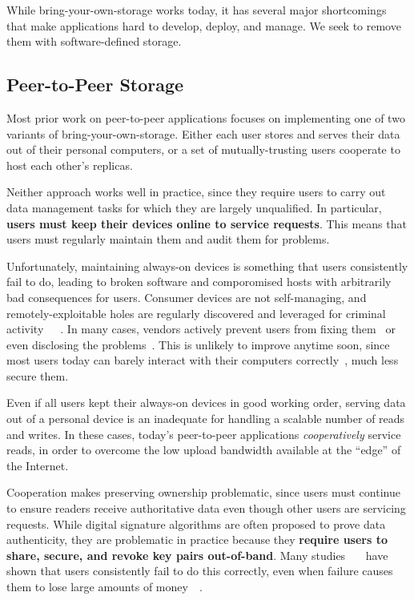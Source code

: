 While bring-your-own-storage works today, it has several major shortcomings that
make applications hard to develop, deploy, and manage.  We seek to remove them
with software-defined storage.

\subsection{Peer-to-Peer Storage}

Most prior work on peer-to-peer applications
focuses on implementing one of two variants of bring-your-own-storage.
Either each user stores and serves their
data out of their personal computers, or a set of mutually-trusting
users cooperate to host each other's replicas.

Neither approach works well in practice, since they require users to carry
out data management tasks for which they are largely unqualified.
In particular, \textbf{users must keep their devices online to service requests}.
This means that users must regularly maintain them and audit them
for problems.

Unfortunately, maintaining always-on devices is something that
users consistently fail to do, leading to broken software and comporomised hosts with arbitrarily
bad consequences for users.  Consumer devices are not self-managing,
and remotely-exploitable holes are regularly discovered and leveraged
for criminal activity~\cite{iot-weaknesses}~\cite{mining-your-ps-and-qs}~\cite{router-exploits}.
In many cases, vendors actively prevent users from fixing
them~\cite{eff-reports} or even disclosing the problems~\cite{sueing-researchers}.
This is unlikely to improve anytime soon, since most users today can barely
interact with their computers correctly~\cite{un-study}, much less secure them.

Even if all users kept their always-on devices in good working order,
serving data out of a personal device is an inadequate for handling a scalable
number of reads and writes.  In these cases, today's peer-to-peer
applications \emph{cooperatively} service reads, in order to overcome the
low upload bandwidth available at the ``edge'' of the Internet.

Cooperation makes preserving ownership problematic, since users must continue
to ensure readers receive authoritative data even though other users are
servicing requests.  While digital signature algorithms are often proposed to prove
data authenticity, they are problematic in practice because they
\textbf{require users to share, secure, and revoke key pairs out-of-band}.
Many studies~\cite{why-johnny-cant-encrypt}~\cite{why-johnny-still-cant-encrypt}~\cite{why-johnny-still-still-cant-encrypt}
have shown that users consistently fail to do this correctly, even when failure
causes them to lose large amounts of money~\cite{mt-gox}~\cite{bitfinex}.

